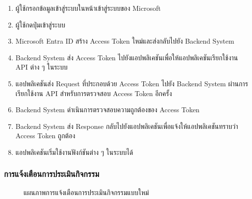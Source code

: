 \documentclass[14pt,oneside,openright,a4paper]{cpe-thai-project}
\begin{document}
\begin{enumerate}
    \item ผู้ใช้กรอกข้อมูลเข้าสู่ระบบในหน้าเข้าสู่ระบบของ Microsoft
    \item ผู้ใช้กดปุ่มเข้าสู่ระบบ
    \item Microsoft Entra ID สร้าง Access Token ใหม่และส่งกลับไปยัง Backend System
    \item Backend System ส่ง Access Token ไปยังแอปพลิเคชันเพื่อให้แอปพลิเคชันเรียกใช้งาน API ต่าง ๆ ในระบบ
    \item แอปพลิเคชันส่ง Request ที่ประกอบด้วย Access Token ไปยัง Backend System ผ่านการเรียกใช้งาน API สำหรับการตรวจสอบ Access Token อีกครั้ง
    \item Backend System ดำเนินการตรวจสอบความถูกต้องของ Access Token
    \item Backend System ส่ง Response กลับไปยังแอปพลิเคชันเพื่อแจ้งให้แอปพลิเคชันทราบว่า Access Token ถูกต้อง
    \item แอปพลิเคชันเริ่มใช้งานฟังก์ชันต่าง ๆ ในระบบได้
  \end{enumerate}
  
  \subsubsection{การแจ้งเตือนการประเมินกิจกรรม} 
  \begin{figure}[H]\centering
    \setlength{\fboxrule}{0.5mm} %
    \setlength{\fboxsep}{0.5cm}
    \caption{แผนภาพการแจ้งเตือนการประเมินกิจกรรมแบบใหม่}\label{fig:editedevaluationsequencediagram}
   \end{figure}
\end{document}
